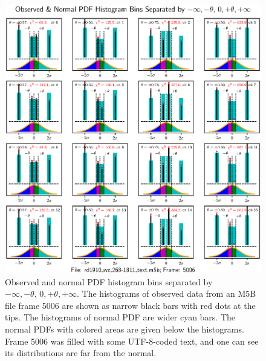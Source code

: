 \documentclass[letterpaper,twoside,12pt]{article}
\begin{document}
\begin{figure}[ht!]
  \begin{center}
  \includegraphics[width=35pc]{fig_4x4_Histograms_text_inserted.eps}
  \caption{\small Observed and normal PDF histogram bins separated by $-\infty, -\theta, \, 0, +\theta, +\infty$. The histograms of observed data from an M5B file frame 5006 are shown as narrow black bars with red dots at the tips. The histograms of normal PDF are wider cyan bars. The normal PDFs with colored areas are given below the histograms. Frame 5006 was filled with some UTF-8-coded text, and one can see its distributions are far from the normal.}
  \label{hists_text_4x4}
  \end{center}
\end{figure}
\end{document}
